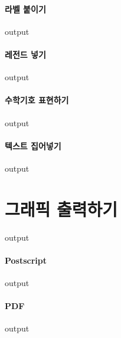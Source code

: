 \paragraph{라벨 붙이기}
\begin{Schunk}
\begin{Soutput}
output
\end{Soutput}
\end{Schunk}
\paragraph{레전드 넣기}
\begin{Schunk}
\begin{Soutput}
output
\end{Soutput}
\end{Schunk}
\paragraph{수학기호 표현하기}
\begin{Schunk}
\begin{Soutput}
output
\end{Soutput}
\end{Schunk}
\paragraph{텍스트 집어넣기}
\begin{Schunk}
\begin{Soutput}
output
\end{Soutput}
\end{Schunk}

\section{그래픽 출력하기}
\begin{Schunk}
\begin{Soutput}
output
\end{Soutput}
\end{Schunk}
\paragraph{Postscript}
\begin{Schunk}
\begin{Soutput}
output
\end{Soutput}
\end{Schunk}
\paragraph{PDF}
\begin{Schunk}
\begin{Soutput}
output
\end{Soutput}
\end{Schunk}
